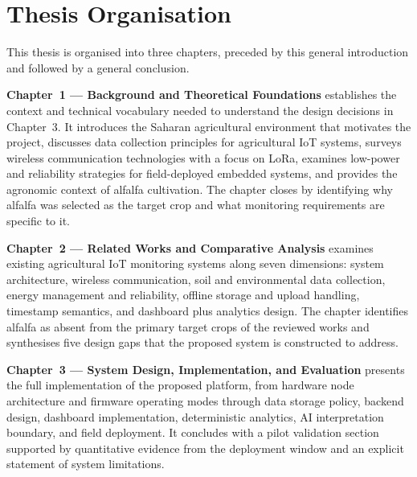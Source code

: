 \section*{Thesis Organisation}

This thesis is organised into three chapters, preceded by this general introduction
and followed by a general conclusion.

\textbf{Chapter~1 — Background and Theoretical Foundations} establishes the context
and technical vocabulary needed to understand the design decisions in Chapter~3.
It introduces the Saharan agricultural environment that motivates the project,
discusses data collection principles for agricultural IoT systems, surveys wireless
communication technologies with a focus on LoRa, examines low-power and reliability
strategies for field-deployed embedded systems, and provides the agronomic context
of alfalfa cultivation. The chapter closes by identifying why alfalfa was selected
as the target crop and what monitoring requirements are specific to it.

\textbf{Chapter~2 — Related Works and Comparative Analysis} examines existing
agricultural IoT monitoring systems along seven dimensions: system architecture,
wireless communication, soil and environmental data collection, energy management
and reliability, offline storage and upload handling, timestamp semantics, and
dashboard plus analytics design. The chapter identifies alfalfa as absent from
the primary target crops of the reviewed works and synthesises five design gaps
that the proposed system is constructed to address.

\textbf{Chapter~3 — System Design, Implementation, and Evaluation} presents the
full implementation of the proposed platform, from hardware node architecture and
firmware operating modes through data storage policy, backend design, dashboard
implementation, deterministic analytics, AI interpretation boundary, and field
deployment. It concludes with a pilot validation section supported by quantitative
evidence from the deployment window and an explicit statement of system limitations.

